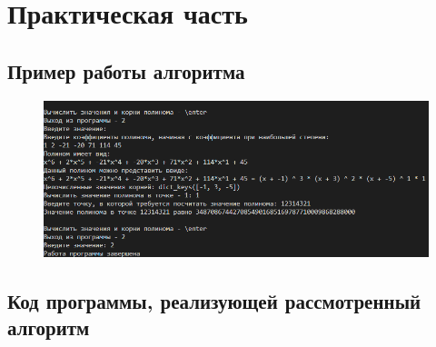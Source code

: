 \documentclass[bachelor, och, labwork]{shiza}
\begin{document}
\section{Практическая часть}
\subsection{Пример работы алгоритма}
\begin{figure}[H]
    \centering
    \includegraphics[width=1\textwidth]{pic1.png}
    \caption{}
\end{figure}

    \subsection{Код программы, реализующей рассмотренный алгоритм}
        \inputminted{python}{lab15.py}
\end{document}
